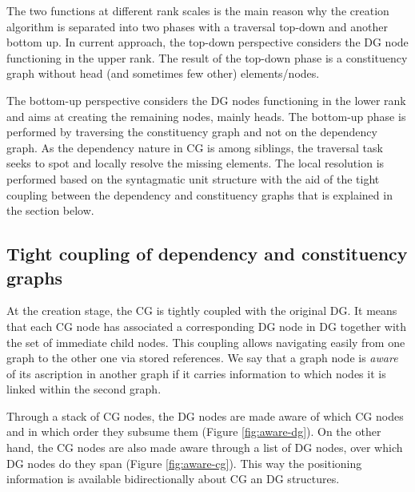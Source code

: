 The two functions at different rank scales is the main reason why the creation algorithm is separated into two phases with a traversal top-down and another bottom up. In current approach, the top-down perspective considers the DG node functioning in the upper rank. The result of the top-down phase is a constituency graph without head (and sometimes few other) elements/nodes.

The bottom-up perspective considers the DG nodes functioning in the lower rank and aims at creating the remaining nodes, mainly heads. The bottom-up phase is performed by traversing the constituency graph and not on the dependency graph. As the dependency nature in CG is among siblings, the traversal task seeks to spot and locally resolve the missing elements. The local resolution is performed based on the syntagmatic unit structure with the aid of the tight coupling between the dependency and constituency graphs that is explained in the section below.

\subsection{Tight coupling of dependency and constituency graphs}
\label{sec:tight-coupling}
At the creation stage, the CG is tightly coupled with the original DG. It means that each CG node has associated a corresponding DG node in DG together with the set of immediate child nodes. This coupling allows navigating easily from one graph to the other one via stored references. We say that a graph node is \textit{aware} of its ascription in another graph if it carries information to which nodes it is linked within the second graph.


Through a stack of CG nodes, the DG nodes are made aware of which CG nodes and in which order they subsume them (Figure \ref{fig:aware-dg}). On the other hand, the CG nodes are also made aware through a list of DG nodes, over which DG nodes do they span (Figure \ref{fig:aware-cg}). This way the positioning information is available bidirectionally about CG an DG structures.

